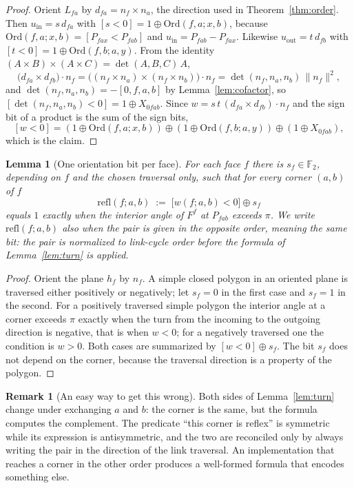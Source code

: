 \documentclass[11pt,reqno]{amsart}
\theoremstyle{plain}
\newtheorem{lemma}[theorem]{Lemma}
\theoremstyle{definition}
\newtheorem{remark}[theorem]{Remark}
\newcommand{\FF}{\mathbb{F}_2}
\newcommand{\bra}[1]{[#1]}
\newcommand{\Ord}{\mathrm{Ord}}
\newcommand{\refl}{\mathrm{refl}}
\newcommand{\xor}{\oplus}
\DeclareMathOperator{\dett}{det}
\begin{document}
\begin{proof}
Orient $L_{fa}$ by $d_{fa}=n_f\times n_a$, the direction used in Theorem~\ref{thm:order}. Then
$u_{\mathrm{in}}=s\,d_{fa}$ with $[s<0]=1\xor\Ord(f,a;x,b)$, because $\Ord(f,a;x,b)=[P_{fax}<P_{fab}]$
and $u_{\mathrm{in}}=P_{fab}-P_{fax}$. Likewise $u_{\mathrm{out}}=t\,d_{fb}$ with
$[t<0]=1\xor\Ord(f,b;a,y)$. From the identity $(A\times B)\times(A\times C)=\dett(A,B,C)\,A$,
\[
  \big(d_{fa}\times d_{fb}\big)\cdot n_f=\big((n_f\times n_a)\times(n_f\times n_b)\big)\cdot n_f
  =\dett(n_f,n_a,n_b)\,\lVert n_f\rVert^{2},
\]
and $\dett(n_f,n_a,n_b)=-\bra{0,f,a,b}$ by Lemma~\ref{lem:cofactor}, so
$[\dett(n_f,n_a,n_b)<0]=1\xor X_{0fab}$. Since $w=s\,t\,(d_{fa}\times d_{fb})\cdot n_f$ and the sign
bit of a product is the sum of the sign bits,
\[
 [w<0]=(1\xor\Ord(f,a;x,b))\xor(1\xor\Ord(f,b;a,y))\xor(1\xor X_{0fab}),
\]
which is the claim.
\end{proof}

\begin{lemma}[One orientation bit per face]\label{lem:sf}
For each face $f$ there is $s_f\in\FF$, depending on $f$ and the chosen traversal only, such that for
every corner $(a,b)$ of $f$
\[
   \refl(f;a,b)\;:=\;\big[w(f;a,b)<0\big]\xor s_f
\]
equals $1$ exactly when the interior angle of $F^f$ at $P_{fab}$ exceeds $\pi$. We write
$\refl(f;a,b)$ also when the pair is given in the opposite order, meaning the same bit: the pair is
normalized to link-cycle order before the formula of Lemma~\ref{lem:turn} is applied.
\end{lemma}

\begin{proof}
Orient the plane $h_f$ by $n_f$. A simple closed polygon in an oriented plane is traversed either
positively or negatively; let $s_f=0$ in the first case and $s_f=1$ in the second. For a positively
traversed simple polygon the interior angle at a corner exceeds $\pi$ exactly when the turn from the
incoming to the outgoing direction is negative, that is when $w<0$; for a negatively traversed one the
condition is $w>0$. Both cases are summarized by $[w<0]\xor s_f$. The bit $s_f$ does not depend on the
corner, because the traversal direction is a property of the polygon.
\end{proof}

\begin{remark}[An easy way to get this wrong]\label{rem:order-matters}
Both sides of Lemma~\ref{lem:turn} change under exchanging $a$ and $b$: the corner is the same, but the
formula computes the complement. The predicate ``this corner is reflex'' is symmetric while its
expression is antisymmetric, and the two are reconciled only by always writing the pair in the
direction of the link traversal. An implementation that reaches a corner in the other order produces a
well-formed formula that encodes something else.
\end{remark}
\end{document}
